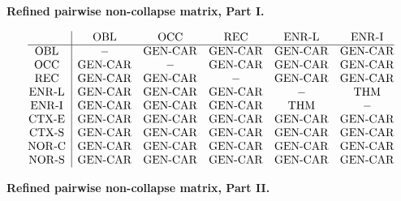 \medskip
\noindent\textbf{Refined pairwise non-collapse matrix, Part I.}

\[
\begin{array}{@{}c|ccccc@{}}
 & \mathrm{OBL} & \mathrm{OCC} & \mathrm{REC} & \mathrm{ENR\mbox{-}L} & \mathrm{ENR\mbox{-}I} \\
\hline
\mathrm{OBL} & - & \mathrm{GEN\mbox{-}CAR} & \mathrm{GEN\mbox{-}CAR} & \mathrm{GEN\mbox{-}CAR} & \mathrm{GEN\mbox{-}CAR} \\
\mathrm{OCC} & \mathrm{GEN\mbox{-}CAR} & - & \mathrm{GEN\mbox{-}CAR} & \mathrm{GEN\mbox{-}CAR} & \mathrm{GEN\mbox{-}CAR} \\
\mathrm{REC} & \mathrm{GEN\mbox{-}CAR} & \mathrm{GEN\mbox{-}CAR} & - & \mathrm{GEN\mbox{-}CAR} & \mathrm{GEN\mbox{-}CAR} \\
\mathrm{ENR\mbox{-}L} & \mathrm{GEN\mbox{-}CAR} & \mathrm{GEN\mbox{-}CAR} & \mathrm{GEN\mbox{-}CAR} & - & \mathrm{THM} \\
\mathrm{ENR\mbox{-}I} & \mathrm{GEN\mbox{-}CAR} & \mathrm{GEN\mbox{-}CAR} & \mathrm{GEN\mbox{-}CAR} & \mathrm{THM} & - \\
\mathrm{CTX\mbox{-}E} & \mathrm{GEN\mbox{-}CAR} & \mathrm{GEN\mbox{-}CAR} & \mathrm{GEN\mbox{-}CAR} & \mathrm{GEN\mbox{-}CAR} & \mathrm{GEN\mbox{-}CAR} \\
\mathrm{CTX\mbox{-}S} & \mathrm{GEN\mbox{-}CAR} & \mathrm{GEN\mbox{-}CAR} & \mathrm{GEN\mbox{-}CAR} & \mathrm{GEN\mbox{-}CAR} & \mathrm{GEN\mbox{-}CAR} \\
\mathrm{NOR\mbox{-}C} & \mathrm{GEN\mbox{-}CAR} & \mathrm{GEN\mbox{-}CAR} & \mathrm{GEN\mbox{-}CAR} & \mathrm{GEN\mbox{-}CAR} & \mathrm{GEN\mbox{-}CAR} \\
\mathrm{NOR\mbox{-}S} & \mathrm{GEN\mbox{-}CAR} & \mathrm{GEN\mbox{-}CAR} & \mathrm{GEN\mbox{-}CAR} & \mathrm{GEN\mbox{-}CAR} & \mathrm{GEN\mbox{-}CAR} \\
\end{array}
\]

\medskip
\noindent\textbf{Refined pairwise non-collapse matrix, Part II.}

